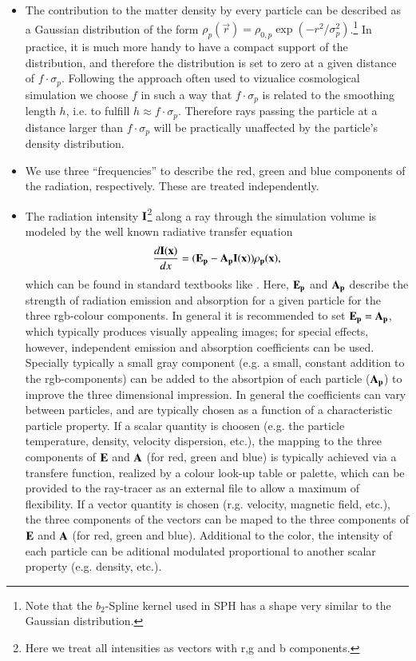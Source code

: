 \begin{itemize}
\item The contribution to the matter density by every particle can
be described as a Gaussian distribution of the form 
$\rho_p(\vec r)=\rho_{0,p}\exp(-r^2/\sigma_p^2)$.\footnote{Note that the
$b_2$-Spline kernel used in SPH has a shape very similar to the Gaussian distribution.} In
practice, it is much more handy to have a compact support of the
distribution, and therefore the distribution is set to zero at a given
distance of $f\cdot\sigma_p$. Following the approach often used to vizualice 
cosmological simulation we choose $f$ in such a way that
$f\cdot\sigma_p$ is related to the smoothing length $h$, i.e.
to fulfill $h \approx f\cdot\sigma_p$. Therefore rays passing
the particle at a distance larger than $f\cdot\sigma_p$ will be practically
unaffected by the particle's density distribution.
\item We use three ``frequencies'' to describe the red, green and blue
components of the radiation, respectively. These are treated independently.
\item The radiation intensity $\bf{I}$\footnote{Here we treat all
intensities as vectors with r,g and b components.} along a ray through the simulation
volume is modeled by the well known radiative transfer equation
\begin{equation}
\frac{d\bf{I}(x)}{dx}=(\bf{E}_p-\bf{A}_p\bf{I}(x))\rho_p(x),
\end{equation}
which can be found in standard textbooks like \citet{1991par..book.....S}.
Here, $\bf{E}_p$ and $\bf{A}_p$ describe the strength of radiation emission and absorption
for a given particle for the three rgb-colour components. In general it is recommended to
set $\bf{E}_p=\bf{A}_p$, which typically produces visually appealing images; for special
effects, however, independent emission and absorption coefficients can be used. Specially typically
a small gray component (e.g. a small, constant addition to the rgb-components) can be added 
to the absortpion of each particle ($\bf{A}_p$) to improve the three dimensional impression.
In general the coefficients can vary between particles, and are typically chosen as a function 
of a characteristic particle property. If a scalar quantity is choosen (e.g. the particle temperature, 
density, velocity dispersion, etc.), the mapping to the three components of $\bf{E}$ and $\bf{A}$ (for red, green and blue)
is typically achieved via a transfere function, realized by a colour look-up table or palette, which can
be provided to the ray-tracer as an external file to allow a maximum of flexibility. If a
vector quantity is chosen (r.g. velocity, magnetic field, etc.), the three components of the vectors
can be maped to the three components of $\bf{E}$ and $\bf{A}$ (for red, green and blue). Additional 
to the color, the intensity of each particle can be aditional modulated proportional to another
scalar property (e.g. density, etc.).
\end{itemize}

